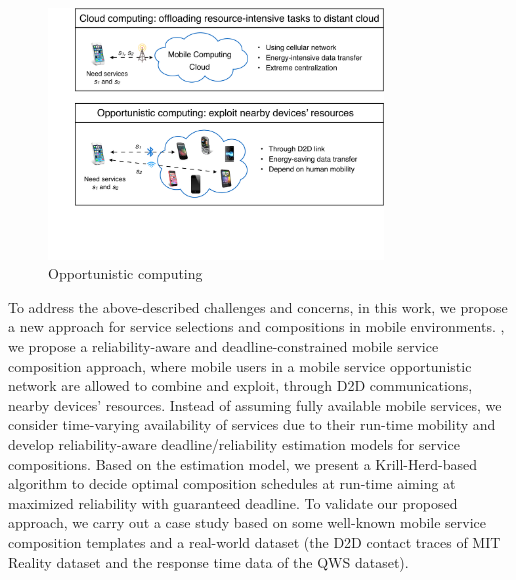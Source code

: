 \documentclass[journal]{IEEEtran}
\begin{document}
\begin{figure}[!t]
\centering
\includegraphics[width=3.5in]{./img/pic1.pdf}
\caption{Opportunistic computing}
\label{Opportunistic computing}
\end{figure}



To address the above-described challenges and concerns, in this work, we propose a new approach for service selections and compositions in mobile environments.
, we propose a reliability-aware and deadline-constrained mobile service composition approach, where mobile users in a mobile service opportunistic network are allowed to combine and exploit, through D2D communications, nearby devices' resources. Instead of assuming fully available mobile services, we consider time-varying availability of services due to their run-time mobility and develop reliability-aware deadline/reliability estimation models for service compositions. Based on the estimation model, we present a Krill-Herd-based algorithm to decide optimal composition schedules at run-time aiming at maximized reliability with guaranteed deadline. To validate our proposed approach, we carry out a case study based on some well-known mobile service composition templates and a real-world dataset (the D2D contact traces of MIT Reality dataset and the response time data of the QWS dataset).
\end{document}
